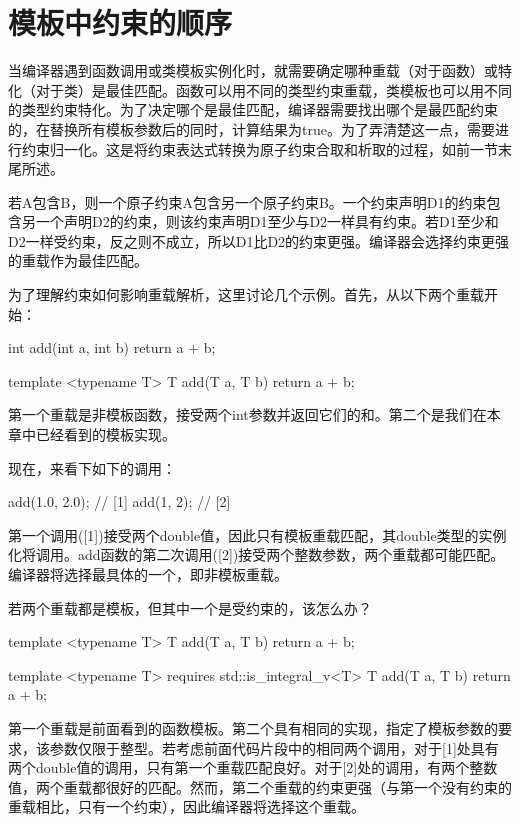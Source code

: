 \section{模板中约束的顺序}
当编译器遇到函数调用或类模板实例化时，就需要确定哪种重载（对于函数）或特化（对于类）是最佳匹配。函数可以用不同的类型约束重载，类模板也可以用不同的类型约束特化。为了决定哪个是最佳匹配，编译器需要找出哪个是最匹配约束的，在替换所有模板参数后的同时，计算结果为true。为了弄清楚这一点，需要进行约束归一化。这是将约束表达式转换为原子约束合取和析取的过程，如前一节末尾所述。

若A包含B，则一个原子约束A包含另一个原子约束B。一个约束声明D1的约束包含另一个声明D2的约束，则该约束声明D1至少与D2一样具有约束。若D1至少和D2一样受约束，反之则不成立，所以D1比D2的约束更强。编译器会选择约束更强的重载作为最佳匹配。

为了理解约束如何影响重载解析，这里讨论几个示例。首先，从以下两个重载开始：

\begin{cppcode}
int add(int a, int b)
{
	return a + b;
}

template <typename T>
T add(T a, T b)
{
	return a + b;
}
\end{cppcode}

第一个重载是非模板函数，接受两个int参数并返回它们的和。第二个是我们在本章中已经看到的模板实现。

现在，来看下如下的调用：

\begin{cppcode}
add(1.0, 2.0); // [1]
add(1, 2); // [2]
\end{cppcode}

第一个调用([1])接受两个double值，因此只有模板重载匹配，其double类型的实例化将调用。add函数的第二次调用([2])接受两个整数参数，两个重载都可能匹配。编译器将选择最具体的一个，即非模板重载。

若两个重载都是模板，但其中一个是受约束的，该怎么办？

\begin{cppcode}
template <typename T>
T add(T a, T b)
{
	return a + b;
}

template <typename T>
requires std::is_integral_v<T>
T add(T a, T b)
{
	return a + b;
}
\end{cppcode}

第一个重载是前面看到的函数模板。第二个具有相同的实现，指定了模板参数的要求，该参数仅限于整型。若考虑前面代码片段中的相同两个调用，对于[1]处具有两个double值的调用，只有第一个重载匹配良好。对于[2]处的调用，有两个整数值，两个重载都很好的匹配。然而，第二个重载的约束更强（与第一个没有约束的重载相比，只有一个约束），因此编译器将选择这个重载。

